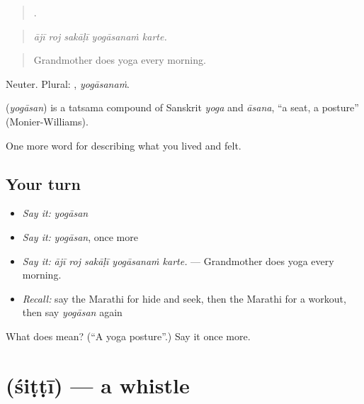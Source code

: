 \begin{quote}
    .
\end{quote}

\begin{quote}
\emph{ājī roj sakāḷī yogāsanaṁ karte.}
\end{quote}

\begin{quote}
Grandmother does yoga every morning.
\end{quote}

Neuter. Plural: , \emph{yogāsanaṁ}.

\begin{cousinweb}
\textbf{} (\emph{yogāsan}) is a tatsama compound of Sanskrit \emph{yoga} and \emph{āsana}, \textquotedblleft{}a seat, a posture\textquotedblright{} (Monier-Williams).
\end{cousinweb}

\begin{grammarlens}[title={What you've built}]
One more word for describing what you lived and felt.
\end{grammarlens}

\subsection*{Your turn}
\begin{itemize}
\raggedright
  \item \emph{Say it:} \emph{yogāsan}
  \item \emph{Say it:} \emph{yogāsan}, once more
  \item \emph{Say it:} \emph{ājī roj sakāḷī yogāsanaṁ karte.} — Grandmother does yoga every morning.
  \item \emph{Recall:} say the Marathi for hide and seek, then the Marathi for a workout, then say \emph{yogāsan} again
\end{itemize}

\begin{tcolorbox}[breakable,colback=teal!4,colframe=teal!35!black,title={Before you move on}]
What does  mean? (\textquotedblleft{}A yoga posture\textquotedblright{}.) Say it once more.
\end{tcolorbox}
\section[\texorpdfstring{\mr{शिट्टी} (śiṭṭī)}{शिट्टी (śiṭṭī)}]{ (śiṭṭī) — a whistle}

